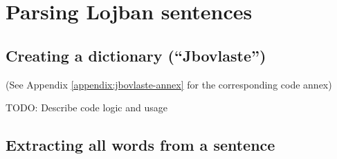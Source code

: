 \chapter{Parsing Lojban sentences}

\section{Creating a dictionary (``Jbovlaste'')}
\label{sec:creating_a_dictionary}

(See Appendix \ref{appendix:jbovlaste-annex} for the corresponding code annex)

TODO: Describe code logic and usage

\section{Extracting all words from a sentence}

